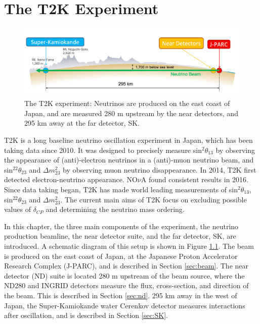 \chapter{The T2K Experiment}\label{sec:T2K}

\begin{figure}[h]
\centering
\includegraphics*[width=1.0\textwidth,clip]{figs/t2kcrosssection}
\caption{The T2K experiment: Neutrinos are produced on the east coast of Japan, and are measured 280 m upstream by the near detectors, and 295 km away at the far detector, SK.} \label{t2kcrosssec}
\end{figure}

T2K is a long baseline neutrino oscillation experiment in Japan, which has been taking data since 2010. It was designed to precisely measure sin$^2\theta_{13}$ by observing the appearance of (anti)-electron neutrinos in a (anti)-muon neutrino beam, and sin$^22\theta_{23}$ and $\Delta m^2_{23}$ by observing muon neutrino disappearance. In 2014, T2K first detected electron-neutrino appearance\cite{nova2016}. NO$\nu$A found consistent results in 2016\cite{PhysRevLett.112.061802}. Since data taking began, T2K has made world leading measurements of sin$^2\theta_{13}$, sin$^22\theta_{23}$ and $\Delta m^2_{23}$. The current main aims of T2K focus on excluding possible values of $\delta_{CP}$ and determining the neutrino mass ordering.

In this chapter, the three main components of the experiment, the neutrino production beamline, the near detector suite, and the far detector, SK, are introduced. A schematic diagram of this setup is shown in Figure \ref{t2kcrosssec}. The beam is produced on the east coast of Japan, at the Japanese Proton Accelerator Research Complex (J-PARC), and is described in Section \ref{sec:beam}. The near detector (ND) suite is located 280 m upstream of the beam source, where the ND280 and INGRID detectors measure the flux, cross-section, and direction of the beam. This is described in Section \ref{sec:nd}. 295 km away in the west of Japan, the Super-Kamiokande water Cerenkov detector measures interactions after oscillation, and is described in Section \ref{sec:SK}.

